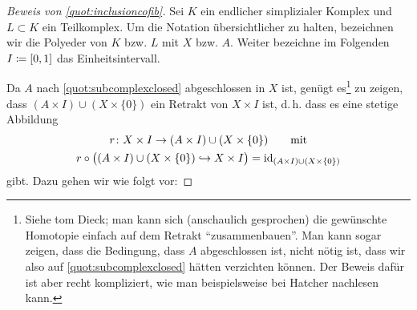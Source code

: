 %

\medskip
\begin{proof}[Beweis von \cref{quot:inclusioncofib}]
    Sei $K$ ein endlicher simplizialer Komplex und $L\subset K$ ein
    Teilkomplex. Um die Notation übersichtlicher zu halten, bezeichnen wir die
    Polyeder von $K$ bzw. $L$ mit $X$ bzw. $A$. Weiter bezeichne im Folgenden
    $I\coloneqq[0,1]$ das Einheitsintervall.

    Da $A$ nach \cref{quot:subcomplexclosed} abgeschlossen in $X$ ist, 
    genügt es\footnote{%
        Siehe tom Dieck\cite[Ch.\,5,.2]{bookc:tomdieck08}; man kann sich
        (anschaulich gesprochen) die gewünschte Homotopie einfach auf dem
        Retrakt \enquote{zusammenbauen}.
        Man kann sogar zeigen, dass die Bedingung, dass $A$ abgeschlossen ist, 
        nicht nötig ist, dass wir also auf \cref{quot:subcomplexclosed} hätten
        verzichten können. Der Beweis dafür ist aber recht kompliziert, wie man
        beispielsweise bei Hatcher\cite[Appendix,\,A.18]{bookc:hatcher02}
        nachlesen kann.%
    }
    zu zeigen, dass $(A\times I)\cup(X\times\{0\})$ ein Retrakt von $X\times I$
    ist, d.\,h. dass es eine stetige Abbildung
    \begin{gather*}
        r\colon X\times I \to (A\times I)\cup(X\times\{0\}) 
        \qquad\text{mit} 
        \\ 
        r \circ \bigl( (A\times I)\cup(X\times\{0\}) \hookrightarrow
        X\times I \bigr) = \operatorname{id}_{(A\times I)\cup(X\times\{0\})}
    \end{gather*}
    gibt.
    Dazu gehen wir wie folgt vor:


\end{proof}
